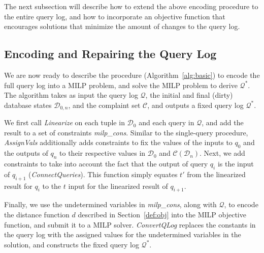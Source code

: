 The next subsection will describe how to extend the above encoding procedure to the 
entire query log, and how to incorporate an objective function that encourages solutions
that minimize the amount of changes to the query log.  







\subsection{Encoding and Repairing the Query Log}
\label{sec:milp}

We are now ready to describe the procedure (Algorithm~\ref{alg:basic}) to encode 
the full query log into a MILP problem, and solve the MILP problem to derive $\mathcal{Q}^*$.
The algorithm takes as input the query log $\mathcal{Q}$, 
the initial and final (dirty) database states 
$\mathcal{D}_{0, n}$, and the complaint set $\mathcal{C}$, and outputs a fixed query 
log $\mathcal{Q}^*$.  

We first call \textit{Linearize} on each tuple in $\mathcal{D}_0$ and each query in $\mathcal{Q}$, 
and add the result to a set of constraints \textit{milp\_cons}.
Similar to the single-query procedure, \textit{AssignVals} additionally 
adds constraints to fix the values of the inputs to $q_0$ and 
the outputs of $q_n$ to their respective values in
$\mathcal{D}_0$ and $\mathcal{C}(\mathcal{D}_n)$.
Next, we add constraints to take into account the fact that the output of 
query $q_i$ is the input of $q_{i+1}$ (\textit{ConnectQueries}).
This function simply equates $t'$ from the linearized result for $q_i$ to the $t$ input 
for the linearized result of $q_{i+1}$.

Finally, we use the undetermined variables in \textit{milp\_cons}, along with $\mathcal{Q}$,
to encode the distance function $d$ described in Section~\ref{def:obj} 
into the MILP objective function, and submit it to a MILP solver.
\textit{ConvertQLog} replaces the constants in the query log with the 
assigned values for the undetermined variables in the solution, and constructs
the fixed query log $\mathcal{Q}^*$.



